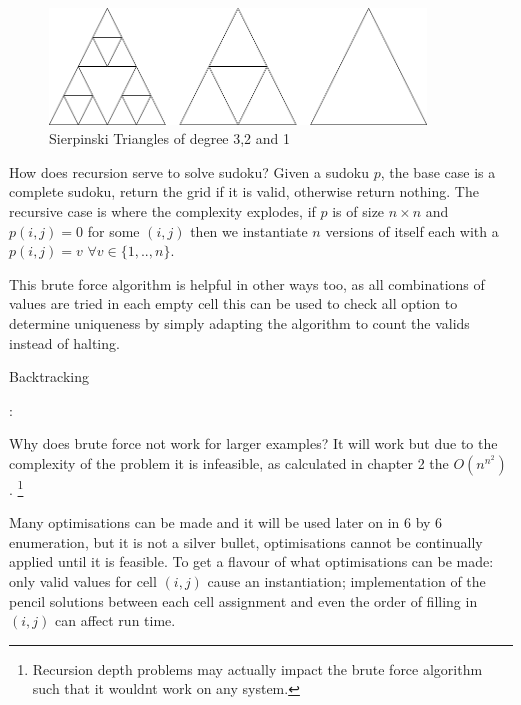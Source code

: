 \documentclass[a4paper,11pt]{report}
\newcounter{row}
\newcounter{col}
\begin{document}
{\begin{figure}[!h]
\begin{center}
		\includegraphics[width=100mm]{figures/SiepTri.png}
\end{center}
		\caption{Sierpinski Triangles of degree 3,2 and 1\label{fig:sieptri}}
\end{figure}

How does recursion serve to solve sudoku? Given a sudoku $p$, the base case is a complete sudoku, return the grid if it is valid, otherwise return nothing. The recursive case is where the complexity explodes, if $p$ is of size $n\times n$ and $p(i,j)=0$ for some $(i,j)$ then we instantiate $n$ versions of itself each with a $p(i,j)=v$ $\forall v \in \{1,..,n\}$. 

This brute force algorithm is helpful in other ways too, as all combinations of values are tried in each empty cell this can be used to check all option to determine uniqueness by simply adapting the algorithm to count the valids instead of halting.

\begin{algorithm}
\caption{Backtracking}
\begin{algorithmic}
                \Else:
	       \EndIf
		\EndIf
\EndIf
\EndFor
\EndFor
\EndProcedure						
\end{algorithmic}
\end{algorithm}

Why does brute force not work for larger examples? It will work but due to the complexity of the problem it is infeasible, as calculated in chapter 2 the $O(n^{n^2})$ . \footnote{Recursion depth problems may actually impact the brute force algorithm such that it wouldnt work on any system.}

Many optimisations can be made and it will be used later on in 6 by 6 enumeration, but it is not a silver bullet, optimisations cannot be continually applied until it is feasible. To get a flavour of what optimisations can be made: only valid values for cell $(i,j)$ cause an instantiation; implementation of the pencil solutions between each cell assignment and even the order of filling in $(i,j)$ can affect run time.

}
\end{document}
